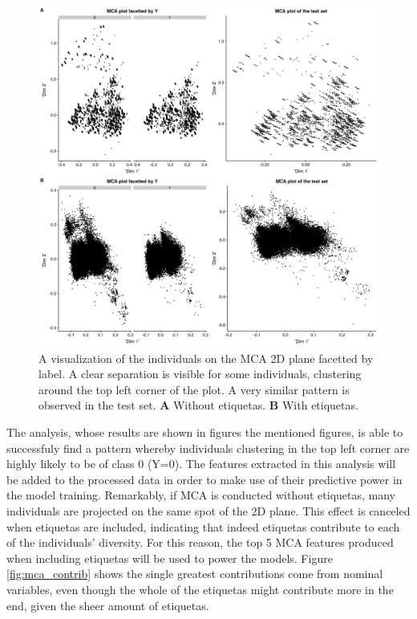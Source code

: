 \documentclass{article}\usepackage[]{graphicx}\usepackage[]{color}
\begin{document}
\begin{figure}[!h]
\centering
\includegraphics[width=.7\textwidth]{plots/mca_obs_Y_facet_all_combined}
\caption{A visualization of the individuals on the MCA 2D plane facetted by label. A clear separation is visible for some individuals, clustering around the top left corner of the plot. A very similar pattern is observed in the test set. \textbf{A} Without etiquetas. \textbf{B} With etiquetas.}
\label{fig:mca_obs_Y}
\end{figure}

The analysis, whose results are shown in figures the mentioned figures, is able to successfuly find a pattern whereby individuals clustering in the top left corner are highly likely to be of class 0 (Y=0). The features extracted in this analysis will be added to the processed data in order to make use of their predictive power in the model training. Remarkably, if MCA is conducted without etiquetas, many individuals are projected on the same spot of the 2D plane. This effect is canceled when etiquetas are included, indicating that indeed etiquetas contribute to each of the individuals' diversity. For this reason, the top 5 MCA features produced when including etiquetas will be used to power the models. Figure \ref{fig:mca_contrib} shows the single greatest contributions come from nominal variables, even though the whole of the etiquetas might contribute more in the end, given the sheer amount of etiquetas.
\end{document}
